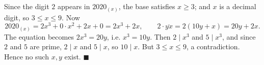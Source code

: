 Since the digit $2$ appears in $2020_{(x)}$, the base satisfies $x\ge3$; and $x$ is a decimal digit, so $3\le x\le9$. Now
\[2020_{(x)}=2x^3+0\cdot x^2+2x+0=2x^3+2x,\qquad 2\cdot\overline{yx}=2(10y+x)=20y+2x.\]
The equation becomes $2x^3=20y$, i.e. $x^3=10y$. Then $2\mid x^3$ and $5\mid x^3$, and since $2$ and $5$ are prime, $2\mid x$ and $5\mid x$, so $10\mid x$. But $3\le x\le9$, a contradiction. Hence no such $x,y$ exist. $\blacksquare$
